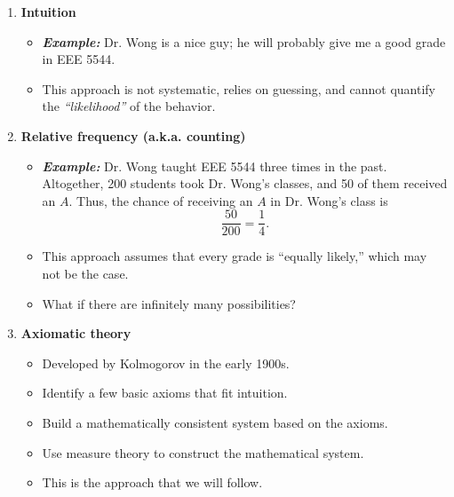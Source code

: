\begin{enumerate}
\item \textbf{Intuition}

\begin{itemize}
\item \textit{\textbf{Example:}} Dr. Wong is a nice guy; he will probably give me a good grade in EEE 5544.
\item This approach is not systematic, relies on guessing, and cannot
quantify the \textit{``likelihood''} of the behavior.
\end{itemize}


\item \textbf{Relative frequency (a.k.a. counting)}

\begin{itemize}
\item \textit{\textbf{Example:}} Dr. Wong taught EEE 5544 three times in the past. Altogether, 200 students took Dr. Wong's classes, and 50 of them received an $A$. Thus, the chance of receiving an $A$ in Dr. Wong's class is
\begin{equation}
\frac{50}{200}=\frac{1}{4}.
\end{equation}


\item This approach assumes that every grade is ``equally likely,'' which may not be the case.
\item What if there are infinitely many possibilities?
\end{itemize}


\item \textbf{Axiomatic theory}

\begin{itemize}
\item Developed by Kolmogorov in the early 1900s.
\item Identify a few basic axioms that fit intuition.
\item Build a mathematically consistent system based on the axioms.
\item Use measure theory to construct the mathematical system.
\item This is the approach that we will follow.
\end{itemize}
\end{enumerate}